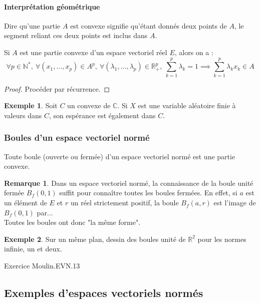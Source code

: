 \documentclass[french]{article}
\newcommand{\N}{\mathbb{N}}
\newcommand{\R}{\mathbb{R}}
\newcommand{\C}{\mathbb{C}}
\newcommand{\st}{^*}
\theoremstyle{plain}
\theoremstyle{definition}
\newtheorem*{ex}{Exemple}
\newtheorem*{rmq}{Remarque}
\theoremstyle{remark}
\begin{document}
\paragraph{Interprétation géométrique} Dire qu'une partie $A$ est convexe signifie qu'étant donnés deux points de $A$, le segment reliant ces deux points est inclus dans $A$.

\begin{prop}%
	Si $A$ est une partie convexe d'un espace vectoriel réel $E$, alors on a : $$\forall p\in\N\st,\ \forall (x_1,\ldots,x_p)\in A^p,\ \forall(\lambda_1,\ldots,\lambda_p)\in\R_+^p,\ \sum_{k=1}^{p}\lambda_k=1\implies\sum_{k=1}^{p}\lambda_kx_k\in A$$
\end{prop}
\begin{proof}
	Procéder par récurrence.
\end{proof}

\begin{ex}
	Soit $C$ un convexe de $\C$. Si $X$ est une variable aléatoire finie à valeurs dans $C$, son espérance est également dans $C$.
\end{ex}

\subsubsection*{Boules d'un espace vectoriel normé}

\begin{prop}%
	Toute boule (ouverte ou fermée) d'un espace vectoriel normé est une partie convexe.
\end{prop}

\begin{rmq}
	Dans un espace vectoriel normé, la connaissance de la boule unité fermée $B_f(0,1)$ suffit pour connaître toutes les boules fermées. En effet, si $a$ est un élément de $E$ et $r$ un réel strictement positif, la boule $B_f(a,r)$ est l'image de $B_f(0,1)$ par... \\
	Toutes les boules ont donc "la même forme".
\end{rmq}

\begin{ex}
	Sur un même plan, dessin des boules unité de $\R^2$ pour les normes infinie, un et deux.
\end{ex}

Exercice Moulin.EVN.13

\subsection{Exemples d'espaces vectoriels normés}
\end{document}
